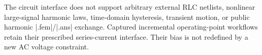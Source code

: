 The circuit interface does not support arbitrary external RLC netlists, nonlinear
large-signal harmonic laws, time-domain hysteresis, transient motion, or public harmonic
|.fem|/|.ans| exchange. Captured incremental operating-point workflows retain
their prescribed series-current interface. Their bias is not redefined by a
new AC voltage constraint.

